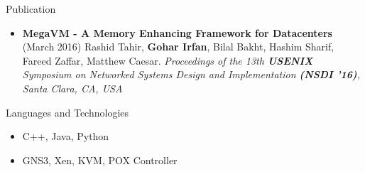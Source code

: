 \documentclass[]{Gohar_CV_Jobs}
\begin{document}
    \begin{cvsection}{Publication}
        \begin{cvsubsection}{}{}{}  
            \begin{itemize}
                \item \textbf{MegaVM - A Memory Enhancing Framework for Datacenters} (March 2016) Rashid Tahir, \textbf{Gohar Irfan}, Bilal Bakht, Hashim Sharif, Fareed Zaffar, Matthew Caesar. \textit{Proceedings of the 13th \textbf{USENIX} Symposium on Networked Systems Design and Implementation \textbf{(NSDI ’16)}, Santa Clara, CA, USA}
            \end{itemize}
        \end{cvsubsection}
    \end{cvsection}
    
    \begin{cvsection}{Languages and Technologies}
        \begin{cvsubsection}{}{}{}  
            \begin{itemize}
                \item C++, Java, Python
                \item GNS3, Xen, KVM, POX Controller
            \end{itemize}
        \end{cvsubsection}
    \end{cvsection}
    
\end{document}
